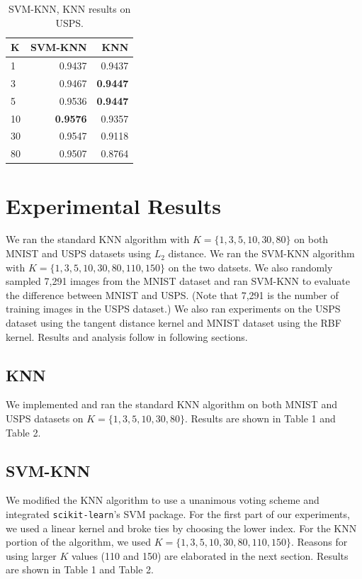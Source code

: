 \documentclass[11pt,letterpaper]{article}
\begin{document}
\begin{table}
\begin{center}
\begin{tabular}{|l|r|r|}
\hline \bf K & \bf SVM-KNN & \bf KNN\\ \hline
1 & 0.9437 & 0.9437\\
3 & 0.9467 & \textbf{0.9447}\\
5 & 0.9536 & \textbf{0.9447}\\
10 & \textbf{0.9576} & 0.9357\\
30 & 0.9547 & 0.9118\\
80 & 0.9507 & 0.8764\\
\hline
\end{tabular}
\end{center}
\caption{\label{knn-mnist} SVM-KNN, KNN results on USPS. }
\end{table}

\section{Experimental Results}

We ran the standard KNN algorithm with $K=\{1,3,5,10,30,80\}$ on both MNIST and USPS datasets using $L_2$ distance. We ran the SVM-KNN algorithm with $K=\{1,3,5,10,30,80,110,150\}$ on the two datsets. We also randomly sampled 7,291 images from the MNIST dataset and ran SVM-KNN to evaluate the difference between MNIST and USPS. (Note that 7,291 is the number of training images in the USPS dataset.) We also ran experiments on the USPS dataset using the tangent distance kernel and MNIST dataset using the RBF kernel. Results and analysis follow in following sections.

\subsection{KNN}

We implemented and ran the standard KNN algorithm on both MNIST and USPS datasets on $K=\{1,3,5,10,30,80\}$. Results are shown in Table 1 and Table 2.

\subsection{SVM-KNN}

We modified the KNN algorithm to use a unanimous voting scheme and integrated {\tt scikit-learn}'s SVM package. For the first part of our experiments, we used a linear kernel and broke ties by choosing the lower index. For the KNN portion of the algorithm, we used $K=\{1,3,5,10,30,80,110,150\}$. Reasons for using larger $K$ values (110 and 150) are elaborated in the next section. Results are shown in Table 1 and Table 2.
\end{document}
